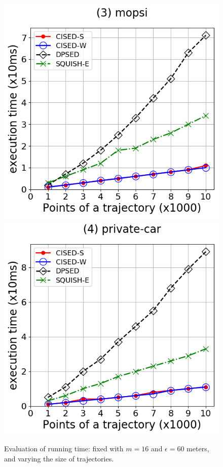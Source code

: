 \begin{figure}[tb!]
\includegraphics[scale = 0.30]{Figures/Exp-time-size-mopsi.png}
\includegraphics[scale = 0.30]{Figures/Exp-time-size-private.png}
\caption{\small Evaluation of running time: fixed with $m=16$ and $\epsilon=60$ meters, and varying the size of trajectories. }
\label{fig:time-size}
\end{figure}







